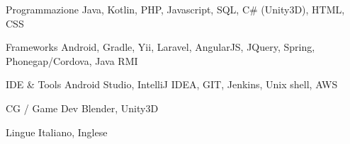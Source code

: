 


\begin{cvskills}


\cvskill
{Programmazione} %
{Java, Kotlin, PHP, Javascript, SQL, C\# (Unity3D), HTML, CSS} %


\cvskill
{Frameworks} %
{Android, Gradle, Yii, Laravel, AngularJS, JQuery, Spring, Phonegap/Cordova, Java RMI} %


\cvskill
{IDE \& Tools} %
{Android Studio, IntelliJ IDEA, GIT, Jenkins, Unix shell, AWS} %


\cvskill
{CG / Game Dev} %
{Blender, Unity3D} %


\cvskill
{Lingue} %
{Italiano, Inglese} %


\end{cvskills}